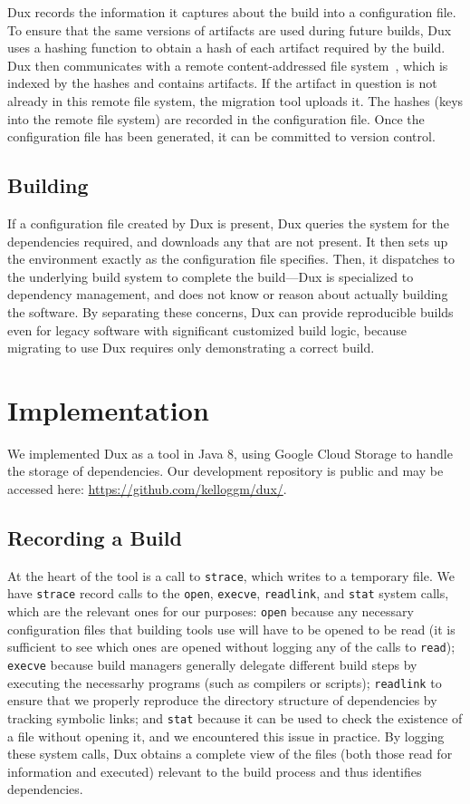 \documentclass[10pt,conference]{IEEEtran}
\begin{document}
Dux records the information it captures about the build into a configuration file.
To ensure that the same versions of artifacts are used during future builds,
Dux uses a hashing function to obtain a hash of each artifact required by the build.
Dux then communicates with a remote content-addressed file system~\cite{venti},
which is indexed by the hashes and contains artifacts.
If the artifact in question is not already in this remote file system, the migration tool uploads it.
The hashes (keys into the remote file system) are recorded in the configuration file.
Once the configuration file has been generated, it can be committed to version control.

\subsection{Building}

If a configuration file created by Dux is present, Dux queries the system for the dependencies required,
and downloads any that are not present.
It then sets up the environment exactly as the configuration file specifies.
Then, it dispatches to the underlying build system to complete the build---Dux is specialized
to dependency management, and does not know or reason about actually building the software.
By separating these concerns, Dux can provide reproducible builds even for legacy software
with significant customized build logic, because migrating to use Dux requires only
demonstrating a correct build.

\section{Implementation}

We implemented Dux as a tool in Java 8, using Google Cloud Storage to handle the storage of dependencies.
Our development repository is public and may be accessed here: \url{https://github.com/kelloggm/dux/}.

\subsection{Recording a Build}
At the heart of the tool is a call to \texttt{strace}, which writes to a temporary file. We have \texttt{strace}
record calls to the \texttt{open}, \texttt{execve}, \texttt{readlink}, and \texttt{stat} system calls,
which are the relevant
ones for our purposes: \texttt{open} because any necessary configuration files that building tools use will
have to be opened to be read (it is sufficient to see which ones are opened without logging any of the
calls to \texttt{read}); \texttt{execve} because build managers generally delegate different build steps by
executing the necessarhy programs (such as compilers or scripts); \texttt{readlink} to ensure that we
properly reproduce the directory structure of dependencies by tracking symbolic links; and \texttt{stat} because
it can be used to check the existence of a file without opening it, and we encountered this issue in practice.
By logging these system
calls, Dux obtains a complete view of the files (both those read for information and executed) relevant to the
build process and thus identifies dependencies.
\end{document}
